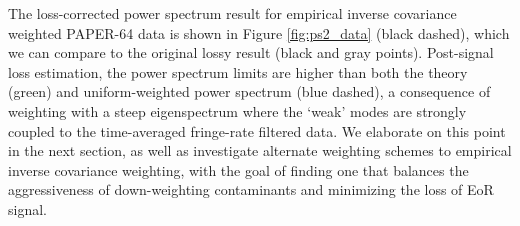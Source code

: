 \documentclass[preprint2,numberedappendix,tighten]{aastex6}  %
\begin{document}

The loss-corrected power spectrum result for empirical inverse covariance weighted PAPER-64 data is shown in Figure \ref{fig:ps2_data} (black dashed), which we can compare to the original lossy result (black and gray points). %
Post-signal loss estimation, the power spectrum limits are higher than both the theory (green) and uniform-weighted power spectrum (blue dashed), a consequence of weighting with a steep eigenspectrum where the `weak' modes are strongly coupled to the time-averaged fringe-rate filtered data. We elaborate on this point in the next section, as well as investigate alternate 
weighting schemes to empirical inverse covariance weighting, with the goal of finding one that balances the aggressiveness of down-weighting contaminants and minimizing the loss of EoR signal. 
\end{document}
